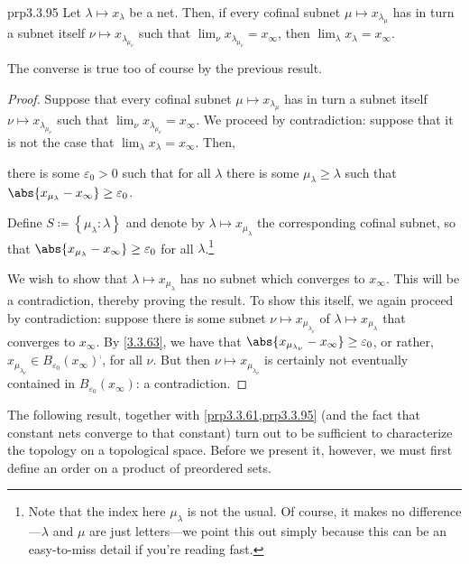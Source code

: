 \begin{prp}{}{prp3.3.95}
Let $\lambda \mapsto x_\lambda$ be a net.  Then, if every cofinal subnet $\mu \mapsto x_{\lambda _\mu}$ has in turn a subnet itself $\nu \mapsto x_{\lambda _{\mu _\nu}}$ such that $\lim _\nu x_{\lambda _{\mu _\nu}}=x_\infty$, then $\lim _\lambda x_\lambda =x_\infty$.
\begin{rmk}
The converse is true too of course by the previous result.
\end{rmk}
\begin{proof}
Suppose that every cofinal subnet $\mu \mapsto x_{\lambda _\mu}$ has in turn a subnet itself $\nu \mapsto x_{\lambda _{\mu _\nu}}$ such that $\lim _\nu x_{\lambda _{\mu _\nu}}=x_\infty$.  We proceed by contradiction:  suppose that it is not the case that $\lim _\lambda x_\lambda =x_\infty$.  Then,
\begin{textequation}[3.3.63]
there is some $\varepsilon _0>0$ such that for all $\lambda$ there is some $\mu _\lambda \geq \lambda$ such that $\abs{x_{\mu _\lambda}-x_\infty}\geq \varepsilon _0$.
\end{textequation}
Define $S\coloneqq \left\{ \mu _\lambda :\lambda \right\}$ and denote by $\lambda \mapsto x_{\mu _\lambda}$ the corresponding cofinal subnet, so that $\abs{x_{\mu _\lambda}-x_\infty}\geq \varepsilon _0$ for all $\lambda$.\footnote{Note that the index here $\mu _{\lambda}$ is not the usual.  Of course, it makes no difference---$\lambda$ and $\mu$ are just letters---we point this out simply because this can be an easy-to-miss detail if you're reading fast.}

We wish to show that $\lambda \mapsto x_{\mu _\lambda}$ has no subnet which converges to $x_\infty$.  This will be a contradiction, thereby proving the result.  To show this itself, we again proceed by contradiction:  suppose there is some subnet $\nu \mapsto x_{\mu _{\lambda _\nu}}$ of $\lambda \mapsto x_{\mu _\lambda}$ that converges to $x_\infty$.  By \eqref{3.3.63}, we have that $\abs{x_{\mu _{\lambda _{\nu}}}-x_{\infty}}\geq \varepsilon _0$, or rather, $x_{\mu _{\lambda _{\nu}}}\in B_{\varepsilon _0}(x_{\infty})^{\comp}$, for all $\nu$.  But then $\nu \mapsto x_{\mu _{\lambda _{\nu}}}$ is certainly not eventually contained in $B_{\varepsilon _0}(x_{\infty})$:  a contradiction.
\end{proof}
\end{prp}
The following result, together with \cref{prp3.3.61,prp3.3.95} (and the fact that constant nets converge to that constant) turn out to be sufficient to characterize the topology on a topological space.  Before we present it, however, we must first define an order on a product of preordered sets.
